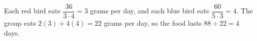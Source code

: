 Each red bird eats $\dfrac{36}{3\cdot4}=3 $ grams per day, and each blue bird eats $\dfrac{60}{5\cdot3}=4 $. The group eats $ 2(3)+4(4)=22 $ grams per day, so the food lasts $ 88\div22=\boxed4 $ days.
